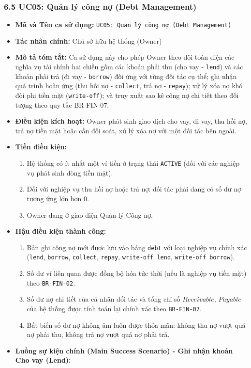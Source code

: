 \documentclass[11pt,a4paper]{article}
\providecommand{\tightlist}{
  \setlength{\itemsep}{0pt}\setlength{\parskip}{0pt}}
\begin{document}
\subsubsection{6.5 UC05: Quản lý công nợ (Debt
Management)}\label{65-uc05-quux1ea3n-luxfd-cuxf4ng-nux1ee3-debt-management}

\begin{itemize}
\tightlist
\item
  \textbf{Mã và Tên ca sử dụng:}
  \texttt{UC05:\ Quản\ lý\ công\ nợ\ (Debt\ Management)}
\item
  \textbf{Tác nhân chính:} Chủ sở hữu hệ thống (Owner)
\item
  \textbf{Mô tả tóm tắt:} Ca sử dụng này cho phép Owner theo dõi toàn
  diện các nghĩa vụ tài chính hai chiều gồm các khoản phải thu (cho vay
  - \texttt{lend}) và các khoản phải trả (đi vay - \texttt{borrow}) đối
  ứng với từng đối tác cụ thể; ghi nhận quá trình hoàn ứng (thu hồi nợ -
  \texttt{collect}, trả nợ - \texttt{repay}); xử lý xóa nợ khó đòi phi
  tiền mặt (\texttt{write-off}); và truy xuất sao kê công nợ chi tiết
  theo đối tượng theo quy tắc BR-FIN-07.
\item
  \textbf{Điều kiện kích hoạt:} Owner phát sinh giao dịch cho vay, đi
  vay, thu hồi nợ, trả nợ tiền mặt hoặc cần đối soát, xử lý xóa nợ với
  một đối tác bên ngoài.
\item
  \textbf{Tiền điều kiện:}

  \begin{enumerate}
  \def\labelenumi{\arabic{enumi}.}
  \tightlist
  \item
    Hệ thống có ít nhất một ví tiền ở trạng thái \texttt{ACTIVE} (đối
    với các nghiệp vụ phát sinh dòng tiền mặt).
  \item
    Đối với nghiệp vụ thu hồi nợ hoặc trả nợ: đối tác phải đang có số dư
    nợ tương ứng lớn hơn 0.
  \item
    Owner đang ở giao diện Quản lý Công nợ.
  \end{enumerate}
\item
  \textbf{Hậu điều kiện thành công:}

  \begin{enumerate}
  \def\labelenumi{\arabic{enumi}.}
  \tightlist
  \item
    Bản ghi công nợ mới được lưu vào bảng \texttt{debt} với loại nghiệp
    vụ chính xác (\texttt{lend}, \texttt{borrow}, \texttt{collect},
    \texttt{repay}, \texttt{write-off\ lend},
    \texttt{write-off\ borrow}).
  \item
    Số dư ví liên quan được đồng bộ hóa tức thời (nếu là nghiệp vụ tiền
    mặt) theo \texttt{BR-FIN-02}.
  \item
    Số dư nợ chi tiết của cá nhân đối tác và tổng chỉ số \(Receivable\),
    \(Payable\) của hệ thống được tính toán lại chính xác theo
    \texttt{BR-FIN-07}.
  \item
    Bất biến số dư nợ không âm luôn được thỏa mãn: không thu nợ vượt quá
    nợ phải thu, không trả nợ vượt quá nợ phải trả.
  \end{enumerate}
\item
  \textbf{Luồng sự kiện chính (Main Success Scenario) - Ghi nhận khoản
  Cho vay (Lend):}


\end{itemize}
\end{document}
